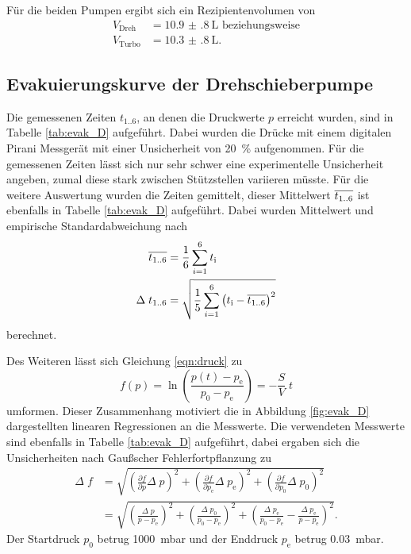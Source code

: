 Für die beiden Pumpen ergibt sich ein Rezipientenvolumen von
\begin{align*}
  V_\text{Dreh} &= \SI{10.9(8)}{\liter} \text{ beziehungsweise}\\
  V_\text{Turbo} &= \SI{10.3(8)}{\liter}.
\end{align*}


\subsection{Evakuierungskurve der Drehschieberpumpe}
\label{sec:AuswEvaD}

Die gemessenen Zeiten $t_\text{1..6}$, an denen die Druckwerte $p$ erreicht
wurden, sind in Tabelle \ref{tab:evak_D} aufgeführt. Dabei wurden die Drücke
mit einem digitalen Pirani Messgerät mit einer
Unsicherheit von \SI{20}{\percent} aufgenommen. Für die gemessenen Zeiten lässt
sich nur sehr schwer eine experimentelle Unsicherheit angeben, zumal diese stark
zwischen Stützstellen variieren müsste. Für die weitere Auswertung wurden die
Zeiten gemittelt, dieser Mittelwert $\overline{t_\text{1..6}}$ ist ebenfalls in
Tabelle \ref{tab:evak_D} aufgeführt.
Dabei wurden Mittelwert und empirische Standardabweichung nach
\begin{align*}
  \overline{t_\text{1..6}} &= \frac{1}{6} \sum_{i = 1}^6 t_\text{i} \\
  \Delta \; t_\text{1..6} &=
  \sqrt{\frac{1}{5} \sum_{i = 1}^6 \left(t_\text{i} - \overline{t_\text{1..6}}\right)^2}
\end{align*}
berechnet.



Des Weiteren lässt sich Gleichung \eqref{eqn:druck} zu
\begin{equation*}
  f\left(p\right) = \ln\left(\frac{p(t)-p_\text{e}}{p_0-p_\text{e}}\right) =
  - \frac{S}{V} \;t
\end{equation*}
umformen. Dieser Zusammenhang motiviert die in Abbildung \ref{fig:evak_D}
dargestellten linearen Regressionen an die Messwerte. Die verwendeten Messwerte
sind ebenfalls in Tabelle \ref{tab:evak_D} aufgeführt, dabei ergaben sich die
Unsicherheiten nach Gaußscher Fehlerfortpflanzung zu
\begin{align*}
  \Delta \; f &=
  \sqrt{\left(\frac{\partial f}{\partial p} \Delta \; p\right)^2 +
  \left(\frac{\partial f}{\partial p_\text{e}} \Delta \; p_\text{e}\right)^2 +
  \left(\frac{\partial f}{\partial p_\text{0}} \Delta \; p_\text{0}\right)^2} \\
  &=
  \sqrt{\left(\frac{\Delta \; p}{p - p_\text{e}}\right)^2 +
  \left(\frac{\Delta \; p_0}{p_0 - p_\text{e}}\right)^2 +
  \left(\frac{\Delta \; p_\text{e}}{p_0 - p_\text{e}} -
  \frac{\Delta \; p_\text{e}}{p - p_\text{e}}\right)^2}.
\end{align*}
Der Startdruck $p_0$ betrug \SI{1000}{\milli\bar} und der Enddruck $p_\text{e}$
betrug \SI{0.03}{\milli\bar}.

